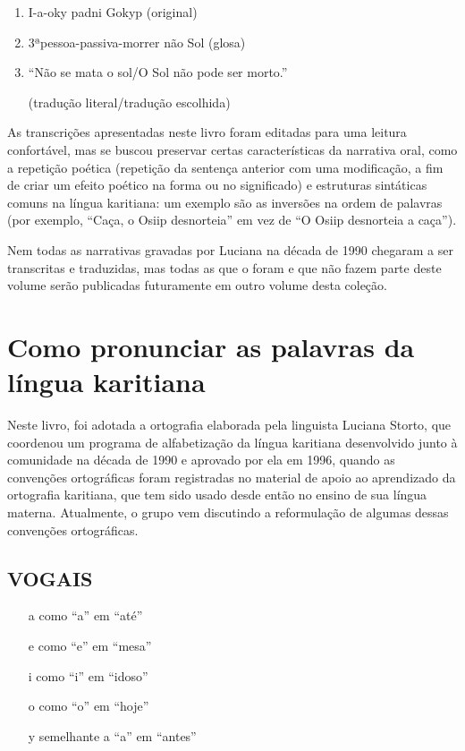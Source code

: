 \begin{enumerate}
\item I-a-oky padni Gokyp (original)

\item 3ªpessoa-passiva-morrer não Sol (glosa)

\item ``Não se mata o sol/O Sol não pode ser morto.''

(tradução literal/tradução escolhida)
\end{enumerate}

As transcrições apresentadas neste livro foram editadas para uma leitura
confortável, mas se buscou preservar certas características da narrativa
oral, como a repetição poética (repetição da sentença anterior com uma
modificação, a fim de criar um efeito poético na forma ou no
significado) e estruturas sintáticas comuns na língua karitiana: um
exemplo são as inversões na ordem de palavras (por exemplo, ``Caça, o
Osiip desnorteia'' em vez de ``O Osiip desnorteia a caça'').

Nem todas as narrativas gravadas por Luciana na década de 1990 chegaram
a ser transcritas e traduzidas, mas todas as que o foram e que não fazem
parte deste volume serão publicadas futuramente em outro volume desta
coleção.

\chapter{Como pronunciar as palavras da língua karitiana}

Neste livro, foi adotada a ortografia elaborada pela linguista Luciana
Storto, que coordenou um programa de alfabetização da língua karitiana
desenvolvido junto à comunidade na década de 1990 e aprovado por ela em
1996, quando as convenções ortográficas foram registradas no material de
apoio ao aprendizado da ortografia karitiana, que tem sido usado desde
então no ensino de sua língua materna. Atualmente, o grupo vem
discutindo a reformulação de algumas dessas convenções ortográficas.

\section{VOGAIS}

\begin{itemize}
\item[a] como ``a'' em ``até''

\item[e] como ``e'' em ``mesa''

\item[i] como ``i'' em ``idoso''

\item[o] como ``o'' em ``hoje''

\item[y] semelhante a ``a'' em ``antes''
\end{itemize}

